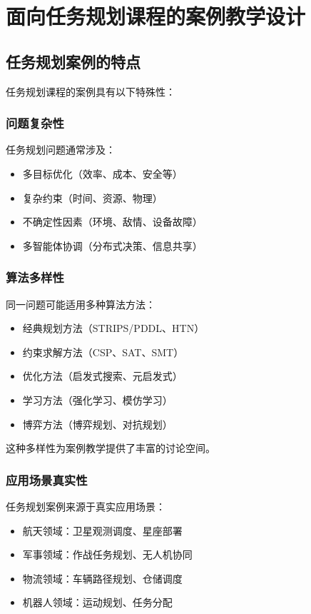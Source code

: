 \documentclass[12pt,a4paper]{ctexart}
\begin{document}
\section{面向任务规划课程的案例教学设计}

\subsection{任务规划案例的特点}

任务规划课程的案例具有以下特殊性：

\subsubsection{问题复杂性}

任务规划问题通常涉及：
\begin{itemize}[leftmargin=2em]
    \item 多目标优化（效率、成本、安全等）
    \item 复杂约束（时间、资源、物理）
    \item 不确定性因素（环境、敌情、设备故障）
    \item 多智能体协调（分布式决策、信息共享）
\end{itemize}

\subsubsection{算法多样性}

同一问题可能适用多种算法方法：
\begin{itemize}[leftmargin=2em]
    \item 经典规划方法（STRIPS/PDDL、HTN）
    \item 约束求解方法（CSP、SAT、SMT）
    \item 优化方法（启发式搜索、元启发式）
    \item 学习方法（强化学习、模仿学习）
    \item 博弈方法（博弈规划、对抗规划）
\end{itemize}

这种多样性为案例教学提供了丰富的讨论空间。

\subsubsection{应用场景真实性}

任务规划案例来源于真实应用场景：
\begin{itemize}[leftmargin=2em]
    \item 航天领域：卫星观测调度、星座部署
    \item 军事领域：作战任务规划、无人机协同
    \item 物流领域：车辆路径规划、仓储调度
    \item 机器人领域：运动规划、任务分配
\end{itemize}
\end{document}
